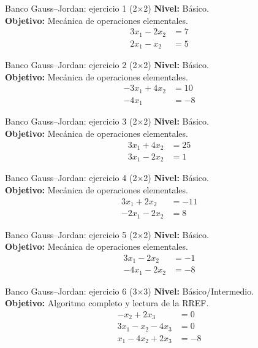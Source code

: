 \documentclass[aspectratio=169,9pt]{beamer}
\theoremstyle{remark}
\begin{document}
\begin{frame}[t]{Banco Gauss--Jordan: ejercicio 1 (2$\times$2)}
\textbf{Nivel:} Básico.\\
\textbf{Objetivo:} Mecánica de operaciones elementales.
\[
\begin{aligned}
3 x_{1} - 2 x_{2} &= 7\\
2 x_{1} - x_{2} &= 5
\end{aligned}
\]
\end{frame}
\begin{frame}[t]{Banco Gauss--Jordan: ejercicio 2 (2$\times$2)}
\textbf{Nivel:} Básico.\\
\textbf{Objetivo:} Mecánica de operaciones elementales.
\[
\begin{aligned}
- 3 x_{1} + 4 x_{2} &= 10\\
- 4 x_{1} &= -8
\end{aligned}
\]
\end{frame}
\begin{frame}[t]{Banco Gauss--Jordan: ejercicio 3 (2$\times$2)}
\textbf{Nivel:} Básico.\\
\textbf{Objetivo:} Mecánica de operaciones elementales.
\[
\begin{aligned}
3 x_{1} + 4 x_{2} &= 25\\
3 x_{1} - 2 x_{2} &= 1
\end{aligned}
\]
\end{frame}
\begin{frame}[t]{Banco Gauss--Jordan: ejercicio 4 (2$\times$2)}
\textbf{Nivel:} Básico.\\
\textbf{Objetivo:} Mecánica de operaciones elementales.
\[
\begin{aligned}
3 x_{1} + 2 x_{2} &= -11\\
- 2 x_{1} - 2 x_{2} &= 8
\end{aligned}
\]
\end{frame}
\begin{frame}[t]{Banco Gauss--Jordan: ejercicio 5 (2$\times$2)}
\textbf{Nivel:} Básico.\\
\textbf{Objetivo:} Mecánica de operaciones elementales.
\[
\begin{aligned}
3 x_{1} - 2 x_{2} &= -1\\
- 4 x_{1} - 2 x_{2} &= -8
\end{aligned}
\]
\end{frame}
\begin{frame}[t]{Banco Gauss--Jordan: ejercicio 6 (3$\times$3)}
\textbf{Nivel:} Básico/Intermedio.\\
\textbf{Objetivo:} Algoritmo completo y lectura de la RREF.
\[
\begin{aligned}
- x_{2} + 2 x_{3} &= 0\\
3 x_{1} - x_{2} - 4 x_{3} &= 0\\
x_{1} - 4 x_{2} + 2 x_{3} &= -8
\end{aligned}
\]
\end{frame}
\end{document}
